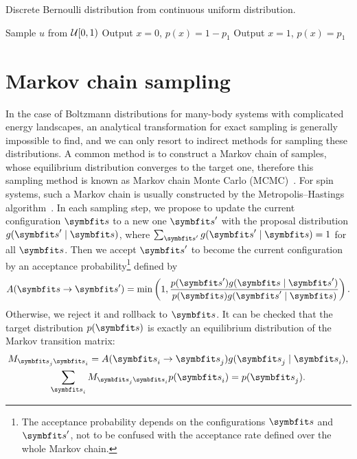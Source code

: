 \begin{algorithm}[H]
\caption[Discrete Bernoulli distribution from continuous uniform distribution]{
Discrete Bernoulli distribution from continuous uniform distribution.
}
\label{alg:bernoulli}
\begin{algorithmic}[1]
\STATE Sample $u$ from $\mathcal{U}[0, 1)$
    \STATE Output $x = 0$, $p(x) = 1 - p_1$
\ELSE
    \STATE Output $x = 1$, $p(x) = p_1$
\ENDIF
\end{algorithmic}
\end{algorithm}

\section{Markov chain sampling}

In the case of Boltzmann distributions for many-body systems with complicated energy landscapes, an analytical transformation for exact sampling is generally impossible to find, and we can only resort to indirect methods for sampling these distributions. A common method is to construct a Markov chain of samples, whose equilibrium distribution converges to the target one, therefore this sampling method is known as Markov chain Monte Carlo (MCMC)~\cite{gelfand1990sampling, robert2020markov}. For spin systems, such a Markov chain is usually constructed by the Metropolis--Hastings algorithm~\cite{hastings1970monte}. In each sampling step, we propose to update the current configuration $\vs$ to a new one $\vs'$ with the proposal distribution $g(\vs' \mid \vs)$, where $\sum_{\vs'} g(\vs' \mid \vs) = 1$ for all $\vs$. Then we accept $\vs'$ to become the current configuration by an acceptance probability\footnote{The acceptance probability depends on the configurations $\vs$ and $\vs'$, not to be confused with the acceptance rate defined over the whole Markov chain.} defined by
\begin{equation}
A(\vs \to \vs') = \min\left( 1, \frac{p(\vs') g(\vs \mid \vs')}{p(\vs) g(\vs' \mid \vs)} \right).
\label{eq:metropolis}
\end{equation}
Otherwise, we reject it and rollback to $\vs$. It can be checked that the target distribution $p(\vs)$ is exactly an equilibrium distribution of the Markov transition matrix:
\begin{gather}
M_{\vs_j \vs_i} = A(\vs_i \to \vs_j) g(\vs_j \mid \vs_i), \label{eq:markov-matrix} \\
\sum_{\vs_i} M_{\vs_j \vs_i} p(\vs_i) = p(\vs_j).
\end{gather}
